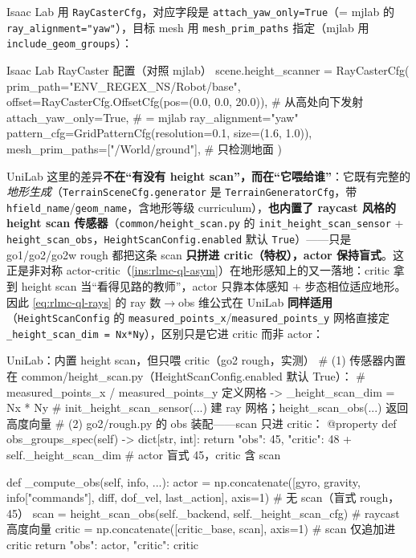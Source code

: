 Isaac Lab 用 \verb|RayCasterCfg|，对应字段是 \verb|attach_yaw_only=True|（= mjlab 的 \verb|ray_alignment="yaw"|），目标 mesh 用 \verb|mesh_prim_paths| 指定（mjlab 用 \verb|include_geom_groups|）：

\begin{codebox}[Python]{Isaac Lab RayCaster 配置（对照 mjlab）}
scene.height_scanner = RayCasterCfg(
    prim_path="{ENV_REGEX_NS}/Robot/base",
    offset=RayCasterCfg.OffsetCfg(pos=(0.0, 0.0, 20.0)),  # 从高处向下发射
    attach_yaw_only=True,                                  # = mjlab ray_alignment="yaw"
    pattern_cfg=GridPatternCfg(resolution=0.1, size=(1.6, 1.0)),
    mesh_prim_paths=["/World/ground"],                     # 只检测地面
)
\end{codebox}

UniLab 这里的差异\textbf{不在“有没有 height scan”，而在“它喂给谁”}：它既有完整的\emph{地形生成}（\verb|TerrainSceneCfg.generator| 是 \verb|TerrainGeneratorCfg|，带 \verb|hfield_name|/\verb|geom_name|，含地形等级 curriculum），\textbf{也内置了 raycast 风格的 height scan 传感器}（\verb|common/height_scan.py| 的 \verb|init_height_scan_sensor| + \verb|height_scan_obs|，\verb|HeightScanConfig.enabled| 默认 \verb|True|）——只是 go1/go2/go2w rough 都把这条 scan \textbf{只拼进 critic（特权），actor 保持盲式}。这正是非对称 actor-critic（\cref{ins:rlmc-ql-asym}）在地形感知上的又一落地：critic 拿到 height scan 当“看得见路的教师”，actor 只靠本体感知 + 步态相位适应地形。因此 \eqref{eq:rlmc-ql-rays} 的 ray 数$\to$obs 维公式在 UniLab \textbf{同样适用}（\verb|HeightScanConfig| 的 \verb|measured_points_x|/\verb|measured_points_y| 网格直接定 \verb|_height_scan_dim = Nx*Ny|），区别只是它进 critic 而非 actor：

\begin{codebox}[Python]{UniLab：内置 height scan，但只喂 critic（go2 rough，实测）}
# (1) 传感器内置在 common/height_scan.py（HeightScanConfig.enabled 默认 True）：
#     measured_points_x / measured_points_y 定义网格 -> _height_scan_dim = Nx * Ny
#     init_height_scan_sensor(...) 建 ray 网格；height_scan_obs(...) 返回高度向量
# (2) go2/rough.py 的 obs 装配——scan 只进 critic：
@property
def obs_groups_spec(self) -> dict[str, int]:
    return {"obs": 45, "critic": 48 + self._height_scan_dim}   # actor 盲式 45，critic 含 scan

def _compute_obs(self, info, ...):
    actor  = np.concatenate([gyro, gravity, info["commands"],
                             diff, dof_vel, last_action], axis=1)   # 无 scan（盲式 rough，45）
    scan   = height_scan_obs(self._backend, self._height_scan_cfg)  # raycast 高度向量
    critic = np.concatenate([critic_base, scan], axis=1)            # scan 仅追加进 critic
    return {"obs": actor, "critic": critic}
\end{codebox}

